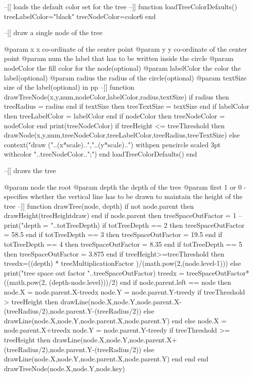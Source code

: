 --[[
loads the default color set for the tree
--]]
function loadTreeColorDefaults()
	treeLabelColor="black"
	treeNodeColor=color6
end

--[[
draw a single node of the tree


@param x x co-ordinate of the center point
@param y y co-ordinate of the center point
@param num the label that has to be written inside the circle
@param nodeColor the fill color for the node(optional)
@param labelColor the color the label(optional)
@param radius the radius of the circle(optional)
@param textSize size of the label(optional) in pp
--]]
function drawTreeNode(x,y,num,nodeColor,labelColor,radius,textSize)
	if radius then
		treeRadius = radius
	end
	if textSize then
		treeTextSize = textSize
	end
	if labelColor then
		treeLabelColor = labelColor
	end
	if nodeColor then
		treeNodeColor = nodeColor
	end
	print(treeNodeColor)
	if treeHeight <= treeThreshold then
		drawNode(x,y,num,treeNodeColor,treeLabelColor,treeRadius,treeTextSize)
	else
		context("draw ("..(x*scale)..","..(y*scale)..") withpen pencircle scaled 3pt withcolor "..treeNodeColor..";")
	end
	loadTreeColorDefaults()
end	

--[[
draws the tree

@param node the root
@param depth the depth of the tree
@param first 1 or 0 - specifies whether the vertical line has to be drawn to maintain the height of the tree
--]]
function drawTree(node, depth)
	if not node.parent then 
		drawHeight(treeHeightdraw)
	end
	if node.parent then
		treeSpaceOutFactor = 1	
		--print("depth = "..totTreeDepth)
		if totTreeDepth == 2 then 
			treeSpaceOutFactor = 58.5			
		end
		if totTreeDepth == 3 then 
			treeSpaceOutFactor = 19.5			
		end
		if totTreeDepth == 4 then 
			treeSpaceOutFactor = 8.35			
		end
		if totTreeDepth == 5 then 
			treeSpaceOutFactor = 3.875			
		end
		if treeHeight>=treeThreshold then
			treedx=((depth) * treeMultiplicationFactor )/(math.pow(2,(node.level-1)))
		else
			print("tree space out factor "..treeSpaceOutFactor)
			treedx = treeSpaceOutFactor*((math.pow(2, (depth-node.level)))/2)
		end
		if node.parent.left == node then		
			node.X = node.parent.X-treedx
			node.Y = node.parent.Y-treedy
			if treeThreshold > treeHeight then
				drawLine(node.X,node.Y,node.parent.X-(treeRadius/2),node.parent.Y-(treeRadius/2))
			else
				drawLine(node.X,node.Y,node.parent.X,node.parent.Y)
			end
		else
			node.X = node.parent.X+treedx
			node.Y = node.parent.Y-treedy
			if treeThreshold >= treeHeight then
				drawLine(node.X,node.Y,node.parent.X+(treeRadius/2),node.parent.Y-(treeRadius/2))
			else
				drawLine(node.X,node.Y,node.parent.X,node.parent.Y)
			end
		end
	end
	drawTreeNode(node.X,node.Y,node.key)

